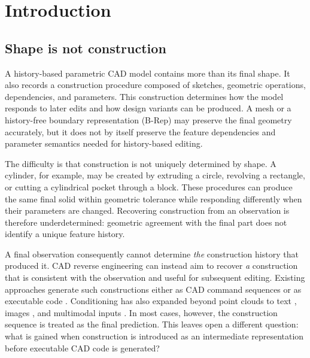 \documentclass[preprint,12pt]{elsarticle}
\begin{document}
\linenumbers

\section{Introduction}
\label{sec:intro}

\subsection{Shape is not construction}
\label{sec:shape_not_construction}

A history-based parametric CAD model contains more than its final shape. It
also records a construction procedure composed of sketches, geometric
operations, dependencies, and parameters. This construction determines how the
model responds to later edits and how design variants can be produced. A mesh
or a history-free boundary representation (B-Rep) may preserve the final
geometry accurately, but it does not by itself preserve the feature
dependencies and parameter semantics needed for history-based editing.

The difficulty is that construction is not uniquely determined by shape. A
cylinder, for example, may be created by extruding a circle, revolving a
rectangle, or cutting a cylindrical pocket through a block. These procedures
can produce the same final solid within geometric tolerance while responding
differently when their parameters are changed. Recovering construction from an
observation is therefore underdetermined: geometric agreement with the final
part does not identify a unique feature history.

A final observation consequently cannot determine \emph{the} construction
history that produced it. CAD reverse engineering can instead aim to recover
\emph{a} construction that is consistent with the observation and useful for
subsequent editing. Existing approaches generate such constructions either as
CAD command sequences
\cite{wu2021deepcad,xu2022skexgen,jayaraman2023solidgen}
or as executable code
\cite{rukhovich2025cadrecode,guan2025cadcoder,wang2025cadfusion}.
Conditioning has also expanded beyond point clouds to text
\cite{khan2024text2cad}, images \cite{you2025img2cad}, and multimodal inputs
\cite{kolodiazhnyi2025cadrille}. In most cases, however, the construction
sequence is treated as the final prediction. This leaves open a different
question: what is gained when construction is introduced as an intermediate
representation before executable CAD code is generated?
\end{document}
